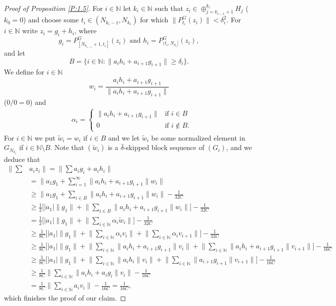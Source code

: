 \documentclass[11pt,leqno]{amsart}
\theoremstyle{definition}
\newcommand{\N}{\mathbb{N}}
\newcommand{\deltab}{\overline\delta}
\newcommand{\wt}{\tilde w}
\begin{document}
\begin{proof}[Proof of Proposition \ref{P:1.5}]
 For $i\in\N$ let $k_i\in\N$ such that
$z_i\in \oplus_{j=k_{i-1}+1}^{k_i} H_j$ ($k_0=0$) and choose some
$t_i \in (N_{k_i-1},N_{k_i})$
 for which $\|P^G_{t_i}(z_i)\|<\delta_i^2$.  For $i\in\N$ write
 $z_i=g_i+h_i$, where
$$g_i=P^G_{[N_{k_{i-1}}+1,t_i]}(z_i)\text{ and } h_i=P^G_{(t_i,N_{k_{i}}]}(z_i) ,$$
and let
$$B=\big\{i\in\N: \|a_ih_i +a_{i+1} g_{i+1}\|\ge \delta_i \big\}.$$
 We define for $i\in\N$
$$w_i = \frac{a_ih_i +a_{i+1} g_{i+1}}{\|a_ih_i +a_{i+1} g_{i+1}\|}$$
 ($0/0=0$) and
\begin{align*}
&\alpha_i=\begin{cases} \|a_ih_i +a_{i+1} g_{i+1}\| &\text{if $i\in B$}\\
                                       0 &\text{if $i\not\in B$.}
                \end{cases}
\end{align*}
For $i\in\N$ we put $\wt_i=w_i$ if $i\in B$ and we let $\wt_i$
 be some normalized element in $G_{N_{k_i}}$ if $i\in \N\setminus B$.
Note that $(\tilde w_i)$ is a $\deltab$-skipped block sequence of $(G_i)$, and
we deduce that
\begin{align*}
  \Big\|\sum &a_i z_i\Big\|=\Big\|\sum a_ig_i+a_ih_i\Big\|\\
  &=\Big\| a_1 g_1+\sum_{i=1}^\infty  \|a_ih_i +a_{i+1} g_{i+1}
  \|w_i\Big\|\\
  &\ge\Big\| a_1 g_1+\sum_{i\in B}  \|a_ih_i +a_{i+1} g_{i+1}\|
  w_i\Big\|-\frac1{32C}\\
  &\ge \frac12\Big[|a_1| \|g_1\|+ \Big\|\sum_{i\in B}  \|a_ih_i
    +a_{i+1} g_{i+1}\|w_i\Big\|\Big]-\frac1{32C}\\
  &= \frac12\Big[|a_1| \|g_1\|+ \Big\|\sum_{i\in\N}      \alpha_i
    \tilde w_i\Big\|    \Big]-\frac1{32C}\\
  &\ge  \frac1{8C}\Big[|a_1| \|g_1\|+ \Big\|\sum_{i\in\N}
    \alpha_i v_i \Big\|+ \Big\|\sum_{i\in\N}
    \alpha_i v_{i+1} \Big\|   \Big]-\frac1{32C}\\
  &\geq\frac1{8C}\Big[|a_1| \|g_1\|+ \Big\|\sum_{i\in\N}   \|a_ih_i
    +a_{i+1} g_{i+1}\|   v_i \Big\|+ \Big\|\sum_{i\in\N}   \|a_ih_i
    +a_{i+1} g_{i+1}\|   v_{i+1} \Big\|   \Big]-\frac1{16C}\\
  &\geq\frac1{8C}\Big[|a_1| \|g_1\|+ \Big\|\sum_{i\in\N}   \|a_ih_i\|
  v_i \Big\|+ \Big\|\sum_{i\in\N}   \|a_{i+1} g_{i+1}\|   v_{i+1}
  \Big\|   \Big]-\frac1{16C}\\
  &\ge  \frac{1}{8C}\Big\|\sum_{i\in\N}   \|a_ih_i+a_ig_i\|v_i\Big\|
  -\frac1{16C}\\
  &= \frac1{8C}\Big\|\sum_{i\in\N}   a_iv_i\Big\| - \frac1{16C}  =
  \frac1{16C},
\end{align*}
which finishes the proof of our claim.\end{proof}
\end{document}
